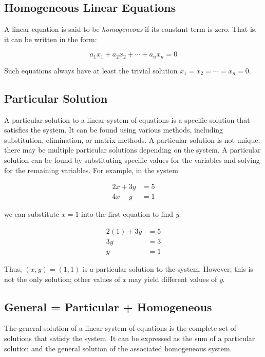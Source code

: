 \subsection{Homogeneous Linear Equations}

A linear equation is said to be \emph{homogeneous} if its constant term is zero. That is, it 
can be written in the form:

\[
	a_1 x_1 + a_2 x_2 + \cdots + a_n x_n = 0
\]

Such equations always have at least the trivial solution \(x_1 = x_2 = \cdots = x_n = 0\).

\subsection{Particular Solution}

A particular solution to a linear system of equations is a specific solution that satisfies the system. 
It can be found using various methods, including substitution, elimination, or matrix methods. A 
particular solution is not unique; there may be multiple particular solutions depending on the system.
A particular solution can be found by substituting specific values for the variables and solving for the 
remaining variables. For example, in the system

\begin{align*}
	2x + 3y & = 5 \\
	4x - y  & = 1
\end{align*}

we can substitute \(x = 1\) into the first equation to find \emph{y}:

\begin{align*}
	2(1) + 3y & = 5 \\
	3y        & = 3 \\
	y         & = 1
\end{align*}

Thus, \((x, y) = (1, 1)\) is a particular solution to the system. However, this is not the only solution; 
other values of \emph{x} may yield different values of \emph{y}.

\subsection{General = Particular + Homogeneous}

The general solution of a linear system of equations is the complete set of solutions that satisfy the 
system. It can be expressed as the sum of a particular solution and the general solution of the associated 
homogeneous system.


